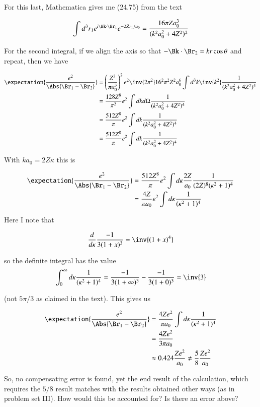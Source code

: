 For this last, Mathematica gives me (24.75) from the text

\begin{equation}\label{eqn:qmTwoL6:n}
\int 
d^3 r_1 
e^{i \Bk \cdot \Br_1 } e^{ -2 Z r_1 /a_0} 
=
\frac{ 16 \pi Z a_0^3 }{(k^2 a_0^2 + 4 Z^2)^2}
\end{equation}

For the second integral, if we align the axis so that $-\Bk \cdot \Br_2 = k r \cos\theta$ and repeat, then we have

\begin{align*}
\expectation{\frac{e^2}{\Abs{\Br_1 - \Br_2}}}
&=
\left( \frac{Z^3}{\pi a_0^3}\right)^2 e^2
\inv{2 \pi^2} 
16^2 \pi^2 Z^2 a_0^6 
\int d^3 k \inv{k^2}
\frac{ 1 }{(k^2 a_0^2 + 4 Z^2)^4} \\
&=
\frac{128 Z^8}{\pi^2 } e^2
\int dk d\Omega 
\frac{ 1 }{(k^2 a_0^2 + 4 Z^2)^4} \\
&=
\frac{512 Z^8}{\pi} e^2
\int dk 
\frac{ 1 }{(k^2 a_0^2 + 4 Z^2)^4} \\
&=
\frac{512 Z^8}{\pi} e^2
\int dk 
\frac{ 1 }{(k^2 a_0^2 + 4 Z^2)^4} \\
\end{align*}

With $k a_0 = 2 Z \kappa$ this is

\begin{align*}
\expectation{\frac{e^2}{\Abs{\Br_1 - \Br_2}}}
&=
\frac{512 Z^8}{\pi} e^2
\int d\kappa 
\frac{ 2 Z }{a_0}
\frac{ 1 }{(2 Z)^8 (\kappa^2 + 1)^4} \\
&=
\frac{4 Z}{\pi a_0} e^2
\int d\kappa 
\frac{ 1 }{(\kappa^2 + 1)^4} \\
\end{align*}

Here I note that 

\begin{align*}
\frac{d}{d\kappa}
\frac{-1}{ 3 (1+x)^3 }
=
\inv{ (1+x)^4 }
\end{align*}

so the definite integral has the value
\begin{align*}
\int_0^\infty d\kappa 
\frac{ 1 }{ (\kappa^2 + 1)^4} 
=
\frac{-1}{ 3 (1+\infty)^3 }
-
\frac{-1}{ 3 (1+0)^3 }
= \inv{3}
\end{align*}

(not $5 \pi/3$ as claimed in the text).  This gives us

\begin{align*}
\expectation{\frac{e^2}{\Abs{\Br_1 - \Br_2}}}
&=
\frac{4 Z e^2} { \pi a_0 } 
\int d\kappa 
\frac{ 1 }{(\kappa^2 + 1)^4} \\
&=
\frac{4 Z e^2} { 3 \pi a_0 }  \\
&\approx 0.424 \frac{Z e^2 }{a_0} \ne \frac{5}{8} \frac{Z e^2 }{a_0}
\end{align*}

So, no compensating error is found, yet the end result of the calculation, which requires the $5/8$ result matches with the results obtained other ways (as in problem set III).  How would this be accounted for?  Is there an error above?

\EndArticle

